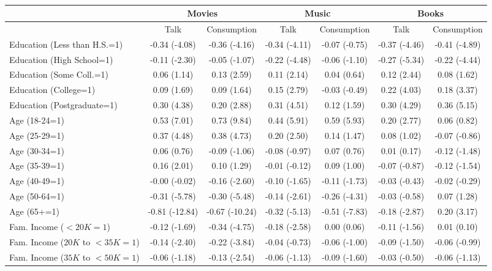 \documentclass[11pt]{article}
\begin{document}
\begin{landscape}
\begin{table}[t]
\caption{}
\begin{tabular}{l*{6}{c}}
\hline
\hline
&\multicolumn{2}{c}{Movies}&\multicolumn{2}{c}{Music}&\multicolumn{2}{c}{Books}\\
\hline
&Talk&Consumption&Talk&Consumption&Talk&Consumption\\
Education (Less than H.S.=1)  &-0.34 (-4.08)&-0.36 (-4.16)&-0.34 (-4.11)&-0.07 (-0.75)&-0.37 (-4.46)&-0.41 (-4.89)\\
Education (High School=1)     &-0.11 (-2.30)&-0.05 (-1.07)&-0.22 (-4.48)&-0.06 (-1.10)&-0.27 (-5.34)&-0.22 (-4.44)\\
Education (Some Coll.=1)      &0.06 (1.14)&0.13 (2.59)&0.11 (2.14)&0.04 (0.64)&0.12 (2.44)&0.08 (1.62)\\
Education (College=1)         &0.09 (1.69)&0.09 (1.64)&0.15 (2.79)&-0.03 (-0.49)&0.22 (4.03)&0.18 (3.37)\\
Education (Postgraduate=1)    &0.30 (4.38)&0.20 (2.88)&0.31 (4.51)&0.12 (1.59)&0.30 (4.29)&0.36 (5.15)\\
Age (18-24=1)                 &0.53 (7.01)&0.73 (9.84)&0.44 (5.91)&0.59 (5.93)&0.20 (2.77)&0.06 (0.82)\\
Age (25-29=1)                 &0.37 (4.48)&0.38 (4.73)&0.20 (2.50)&0.14 (1.47)&0.08 (1.02)&-0.07 (-0.86)\\
Age (30-34=1)                 &0.06 (0.76)&-0.09 (-1.06)&-0.08 (-0.97)&0.07 (0.76)&0.01 (0.17)&-0.12 (-1.48)\\
Age (35-39=1)                 &0.16 (2.01)&0.10 (1.29)&-0.01 (-0.12)&0.09 (1.00)&-0.07 (-0.87)&-0.12 (-1.54)\\
Age (40-49=1)                 &-0.00 (-0.02)&-0.16 (-2.60)&-0.10 (-1.65)&-0.11 (-1.73)&-0.03 (-0.43)&-0.02 (-0.29)\\
Age (50-64=1)                 &-0.31 (-5.78)&-0.30 (-5.48)&-0.14 (-2.61)&-0.26 (-4.31)&-0.03 (-0.58)&0.07 (1.28)\\
Age (65+=1)                   &-0.81 (-12.84)&-0.67 (-10.24)&-0.32 (-5.13)&-0.51 (-7.83)&-0.18 (-2.87)&0.20 (3.17)\\
Fam. Income ($<20K=1$)          &-0.12 (-1.69)&-0.34 (-4.75)&-0.18 (-2.58)&0.00 (0.06)&-0.11 (-1.56)&0.01 (0.10)\\
Fam. Income ($20K$ to $<35K=1$)   &-0.14 (-2.40)&-0.22 (-3.84)&-0.04 (-0.73)&-0.06 (-1.00)&-0.09 (-1.50)&-0.06 (-0.99)\\
Fam. Income ($35K$ to $<50K=1$)   &-0.06 (-1.18)&-0.13 (-2.54)&-0.06 (-1.13)&-0.09 (-1.60)&-0.03 (-0.50)&-0.06 (-1.13)\\

\end{tabular}
\end{table}
\end{landscape}
\end{document}
